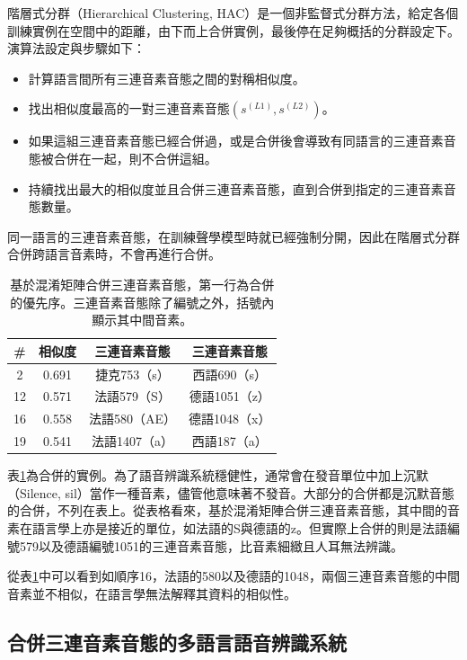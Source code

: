 階層式分群（Hierarchical Clustering, HAC）是一個非監督式分群方法，給定各個訓練實例在空間中的距離，由下而上合併實例，最後停在足夠概括的分群設定下。演算法設定與步驟如下：

\begin{itemize}
 \itemsep -2pt
 \item 計算語言間所有三連音素音態之間的對稱相似度。
 \item 找出相似度最高的一對三連音素音態$( s^{(L1)} , s^{(L2)}  )$。
 \item 如果這組三連音素音態已經合併過，或是合併後會導致有同語言的三連音素音態被合併在一起，則不合併這組。
 \item 持續找出最大的相似度並且合併三連音素音態，直到合併到指定的三連音素音態數量。
\end{itemize}

同一語言的三連音素音態，在訓練聲學模型時就已經強制分開，因此在階層式分群合併跨語言音素時，不會再進行合併。

\begin{table}[!h]
\centering
\begin{tabular}{|cccc|}
\hline
\# & 相似度   & 三連音素音態    & 三連音素音態    \\
\hline
2  & 0.691 & 捷克753（s）  & 西語690（s）  \\
\hline
12 & 0.571 & 法語579（S）  & 德語1051（z） \\
\hline
16 & 0.558 & 法語580（AE） & 德語1048（x） \\
\hline
19 & 0.541 & 法語1407（a） & 西語187（a） \\
\hline
\end{tabular}
\caption{基於混淆矩陣合併三連音素音態，第一行為合併的優先序。三連音素音態除了編號之外，括號內顯示其中間音素。}
\label{table:chap4_CM_merge_examples}
\end{table}
表\ref{table:chap4_CM_merge_examples}為合併的實例。為了語音辨識系統穩健性，通常會在發音單位中加上沉默（Silence, sil）當作一種音素，儘管他意味著不發音。大部分的合併都是沉默音態的合併，不列在表上。從表格看來，基於混淆矩陣合併三連音素音態，其中間的音素在語言學上亦是接近的單位，如法語的S與德語的z。但實際上合併的則是法語編號579以及德語編號1051的三連音素音態，比音素細緻且人耳無法辨識。

從表\ref{table:chap4_CM_merge_examples}中可以看到如順序16，法語的580以及德語的1048，兩個三連音素音態的中間音素並不相似，在語言學無法解釋其資料的相似性。

\subsection{合併三連音素音態的多語言語音辨識系統}

